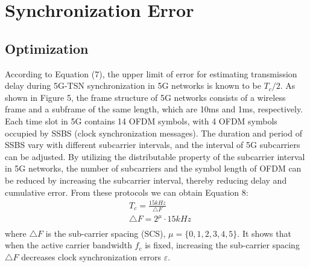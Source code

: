 \documentclass[english]{cccconf}
\begin{document}
\section{Synchronization Error}

\subsection{Optimization}
According to Equation (7), the upper limit of error for estimating transmission delay during 5G-TSN synchronization in 5G networks is known to be $T_c/2$. As shown in Figure 5, the frame structure of 5G networks consists of a wireless frame and a subframe of the same length, which are 10ms and 1ms, respectively. Each time slot in 5G contains 14 OFDM symbols, with 4 OFDM symbols occupied by SSBS (clock synchronization messages). The duration and period of SSBS vary with different subcarrier intervals, and the interval of 5G subcarriers can be adjusted. By utilizing the distributable property of the subcarrier interval in 5G networks, the number of subcarriers and the symbol length of OFDM can be reduced by increasing the subcarrier interval, thereby reducing delay and cumulative error. From these protocols we can obtain Equation 8:
\begin{equation}
	\begin{split}
		&T_{c}=\frac{15kHz}{\triangle F}\\
		&\triangle F=2^\mu\cdot15kHz \\
	\end{split}	
\end{equation}
where $\triangle F$ is the sub-carrier spacing (SCS), $\mu=\{0,1,2,3,4,5\}$. It shows that when the active carrier bandwidth $f_c$ is fixed, increasing the sub-carrier spacing $\triangle F$ decreases clock synchronization errors $\varepsilon$.
\end{document}
